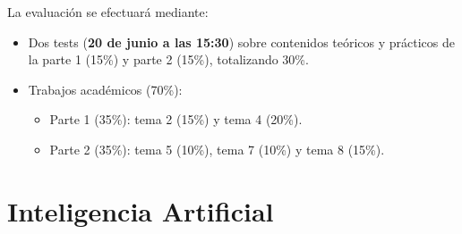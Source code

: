 La evaluación se efectuará mediante:
\begin{itemize}
	\item Dos tests (\textbf{20 de junio a las 15:30}) sobre contenidos teóricos y
prácticos de la parte 1 (15\%) y parte 2 (15\%), totalizando 30\%.
	\item Trabajos académicos (70\%):
   \begin{itemize}
   	\item Parte 1 (35\%): tema 2 (15\%) y tema 4 (20\%).
	   \item Parte 2 (35\%): tema 5 (10\%), tema 7 (10\%) y tema 8 (15\%).
   \end{itemize}
\end{itemize}
\newpage

\section{Inteligencia Artificial}

